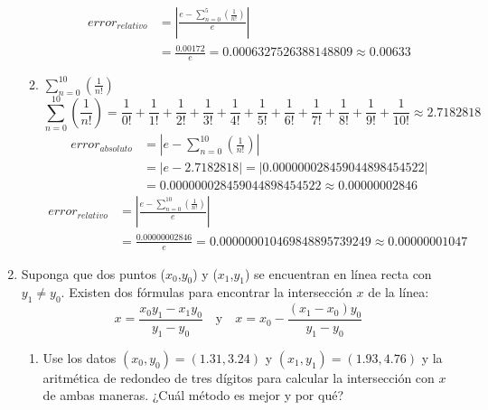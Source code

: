\documentclass[12pt]{article}
\begin{document}
\begin{enumerate}
\begin{enumerate}[label=\alph*.]
\[\begin{aligned}
            \end{aligned}
        \]
        \[
            \begin{aligned}
                error_{relativo} &= \left| \frac{e - \sum_{n = 0}^{5} \left( \frac{1}{n!}\right)}{e}\right| \\
                                 &= \frac{0.00172}{e} = 0.0006327526388148809 \approx 0.00633        
            \end{aligned}
        \]  
        \item \(\sum_{n=0}^{10} \left( \frac{1}{n!}\right)\)
        \[
            \sum_{n = 0}^{10} \left( \frac{1}{n!}\right) = \frac{1}{0!} + \frac{1}{1!} + \frac{1}{2!} + \frac{1}{3!} + \frac{1}{4!} + \frac{1}{5!} + \frac{1}{6!} + \frac{1}{7!} + \frac{1}{8!} + \frac{1}{9!} + \frac{1}{10!} \approx 2.7182818
            \]
            \[
                \begin{aligned}
                    error_{absoluto} &= \left| e - \sum_{n = 0}^{10} \left( \frac{1}{n!}\right)\right| \\
                                     &= \left| e - 2.7182818 \right| = |0.000000028459044898454522| \\
                                     &= 0.000000028459044898454522 \approx 0.00000002846         
                \end{aligned}
            \]
            \[
                \begin{aligned}
                    error_{relativo} &= \left| \frac{e - \sum_{n = 0}^{10} \left( \frac{1}{n!}\right)}{e}\right| \\
                                     &= \frac{0.00000002846}{e} = 0.000000010469848895739249 \approx 0.00000001047        
                \end{aligned}
        \]
    \end{enumerate}

    \item Suponga que dos puntos (\(x_0\),\(y_0\)) y (\(x_1\),\(y_1\)) se encuentran en línea recta con \(y_1 \neq y_0\). Existen dos fórmulas para encontrar la intersección \(x\) de la línea:
    \[x = \frac{x_0y_1 - x_1y_0}{y_1-y_0} \quad \text{y} \quad x = x_0 - \frac{(x_1-x_0)y_0}{y_1-y_0}\]
    
    \begin{enumerate}[label=\alph*.]
        \item Use los datos \((x_0,y_0) = (1.31, 3.24)\) y \((x_1, y_1) = (1.93, 4.76)\) y la aritmética de redondeo de tres dígitos para calcular la intersección con \(x\) de ambas maneras. ¿Cuál método es mejor y por qué?
    \end{enumerate}
    

\end{enumerate}
\end{document}
